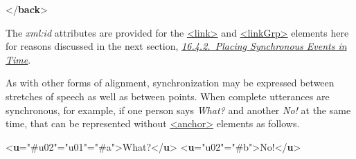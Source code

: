 \begin{shaded}
\hspace*{1em}\mbox{}\newline 
\hspace*{1em}\mbox{}\newline 
\hspace*{1em}\mbox{}\newline 
{}\mbox{}\newline 
{</\textbf{back}>}\end{shaded}\egroup\par \noindent  The {\itshape xml:id} attributes are provided for the \hyperref[TEI.link]{<link>} and \hyperref[TEI.linkGrp]{<linkGrp>} elements here for reasons discussed in the next section, \textit{\hyperref[SASYMP]{16.4.2.\ Placing Synchronous Events in Time}}.\par
As with other forms of alignment, synchronization may be expressed between stretches of speech as well as between points. When complete utterances are synchronous, for example, if one person says \textit{What?} and another \textit{No!} at the same time, that can be represented without \hyperref[TEI.anchor]{<anchor>} elements as follows. \par\bgroup{}\exampleFont \begin{shaded}\noindent\mbox{}{<\textbf{u}\hspace*{1em}{synch}="{\#u02}"\hspace*{1em}{xml:id}="{u01}"\hspace*{1em}{who}="{\#a}">}What?{</\textbf{u}>}\mbox{}\newline 
{<\textbf{u}\hspace*{1em}{xml:id}="{u02}"\hspace*{1em}{who}="{\#b}">}No!{</\textbf{u}>}\end{shaded}\egroup\par \par
